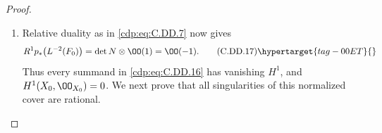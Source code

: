 \begin{proof}
\begin{enumerate}[label={$\langle1\rangle$\arabic*.},leftmargin=*]
\paragraph{A double common zero: normalization of the cyclic cover.}
It remains to take $p^*A=2F_0$. The branch divisor
with multiplicities is $R_1+R_2+2F_0$; its reduced
support $B$ has three components. We use the
normalization of the cyclic cover. Its exact
eigensheaf algebra has underlying module
\[
       \pi_*\OO_{X_0}
       =\OO_E\oplus L^{-1}\oplus L^{-2}(F_0).
\tag{C.DD.16}\hypertarget{tag-00ES}{}\label{cdp:eq:C.DD.16}
\]
At the generic point of $F_0$, write the equation
as $w^3=s^2u$ with $u$ a unit. The extra integral
generator is $w^2/s$. This gives the last summand
in \eqref{cdp:eq:C.DD.16}. At the other branch components the
usual generators $1,w,w^2$ apply. These comparisons
extend across the finitely many crossings: the
normal finite surface is Cohen--Macaulay, so its
finite direct image over the smooth surface $E$
is locally free, and each character summand is
the rank-one reflexive extension of its divisorwise
description. This proves \eqref{cdp:eq:C.DD.16} as a sheaf
identity, not only over the nonsingular locus.

\item Relative duality as in \eqref{cdp:eq:C.DD.7} now gives
\[
 R^1p_*\bigl(L^{-2}(F_0)\bigr)
                       =\det N\otimes\OO(1)=\OO(-1).
\tag{C.DD.17}\hypertarget{tag-00ET}{}\label{cdp:eq:C.DD.17}
\]
Thus every summand in \eqref{cdp:eq:C.DD.16} has vanishing
$H^1$, and $H^1(X_0,\OO_{X_0})=0$.
We next prove that all singularities of this
normalized cover are rational.


\end{enumerate}
\end{proof}
